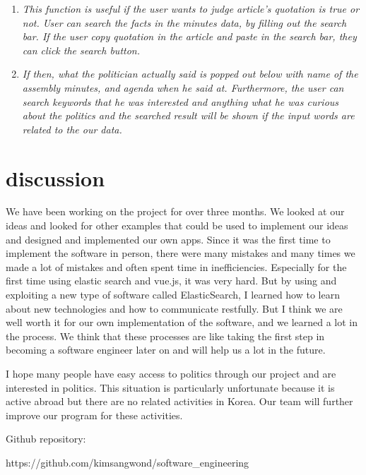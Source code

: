 \documentclass[conference]{IEEEtran}
\begin{document}
\begin{enumerate}
 
 \begin{enumerate}
    \item\textit{This function is useful if the user wants to judge article’s quotation is true or not. User can search the facts in the minutes data, by filling out the search bar. If the user copy quotation in the article and paste in the search bar, they can click the search button.} \\
    \item \textit{ If then, what the politician actually said is popped out below with name of the assembly minutes, and agenda when he said at. Furthermore, the user can search keywords that he was interested and anything what he was curious about the politics and the searched result will be shown if the input words are related to the our data.} \\
\end{enumerate}

\end{enumerate}

\vspace{20mm}

\section{discussion}

We have been working on the project for over three months. We looked at our ideas and looked for other examples that could be used to implement our ideas and designed and implemented our own apps. Since it was the first time to implement the software in person, there were many mistakes and many times we made a lot of mistakes and often spent time in inefficiencies. 
\vspace{6mm}
Especially for the first time using elastic search and vue.js, it was very hard. But by using and exploiting a new type of software called ElasticSearch, I learned how to learn about new technologies and how to communicate restfully. But I think we are well worth it for our own implementation of the software, and we learned a lot in the process. We think that these processes are like taking the first step in becoming a software engineer later on and will help us a lot in the future.
\vspace{6mm}

I hope many people have easy access to politics through our project and are interested in politics. This situation is particularly unfortunate because it is active abroad but there are no related activities in Korea. Our team will further improve our program for these activities.


\vspace{15mm}
Github repository:
\vspace{3mm}

https://github.com/kimsangwond/software\_engineering
\end{document}
